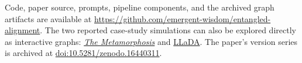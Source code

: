 	Code, paper source, prompts, pipeline components, and the archived graph artifacts are available at \url{https://github.com/emergent-wisdom/entangled-alignment}. The two reported case-study simulations can also be explored directly as interactive graphs: \href{https://emergentwisdom.org/entangled-alignment/?project=metamorphosis}{\emph{The Metamorphosis}} and \href{https://emergentwisdom.org/entangled-alignment/?project=llada}{LLaDA}. The paper's version series is archived at \href{https://doi.org/10.5281/zenodo.16440311}{doi:10.5281/zenodo.16440311}.

	\begingroup
	\footnotesize
	
	
	\endgroup
	

